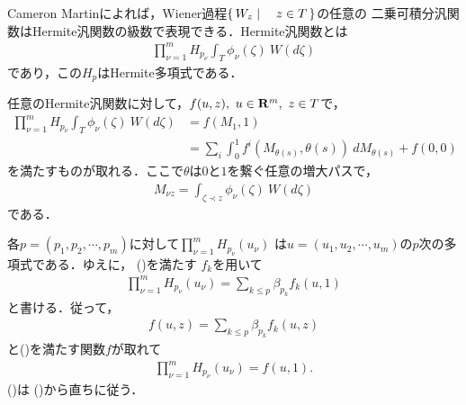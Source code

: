 	Cameron Martinによれば，Wiener過程$\left\{\, W_{z} \mid \quad z \in T\, \right\}$の任意の
	二乗可積分汎関数はHermite汎関数の級数で表現できる．Hermite汎関数とは
	\begin{align}
		\prod_{\nu=1}^{m} H_{p_{\nu}} \int_{T} \phi_{\nu}(\zeta)\ W(d\zeta)
	\end{align}
	であり，この$H_{p}$はHermite多項式である．
	
	\begin{thm}
		任意のHermite汎関数に対して，$f(u,z),\ u \in \mathbf{R}^{m},\ z \in T$で，
		\begin{align}
			\prod_{\nu=1}^{m} H_{p_{\nu}} \int_{T} \phi_{\nu}(\zeta)\ W(d\zeta)
			&= f(M_{1}, 1) \\
			&= \sum_{i} \int_{0}^{1} f^{i}\left(M_{\theta(s)},\theta(s)\right)\ dM_{\theta(s)}
			+ f(0,0)
			\label{fom:Wiener_Integral_and_Hermite_Functionals_4}
		\end{align}
		を満たすものが取れる．ここで$\theta$は$0$と$1$を繋ぐ任意の増大パスで，
		\begin{align}
			M_{\nu z} = \int_{\zeta \prec z} \phi_{\nu}(\zeta)\ W(d\zeta)
		\end{align}
		である．
	\end{thm}
	
	\begin{sketch}
		各$p=(p_{1},p_{2},\cdots,p_{m})$に対して$\prod_{\nu=1}^{m} H_{p_{\nu}}(u_{\nu})$
		は$u=(u_{1},u_{2},\cdots,u_{m})$の$p$次の多項式である．ゆえに，
		()を満たす
		$f_{k}$を用いて
		\begin{align}
			\prod_{\nu=1}^{m} H_{p_{\nu}}(u_{\nu})
			= \sum_{k \leq p} \beta_{p_{k}} f_{k}(u,1)
		\end{align}
		と書ける．従って，
		\begin{align}
			f(u,z) = \sum_{k \leq p} \beta_{p_{k}} f_{k}(u,z)
		\end{align}
		と()を満たす関数$f$が取れて
		\begin{align}
			\prod_{\nu=1}^{m} H_{p_{\nu}}(u_{\nu}) = f(u,1).
		\end{align}
		()は
		()から直ちに従う．
		\QED
	\end{sketch}